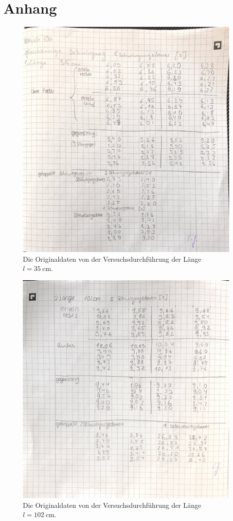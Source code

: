 \section{Anhang}
\label{sec:anhang}


\begin{figure}
    \centering
    \includegraphics[width=\textwidth]{bilder/daten1.pdf}
    \caption{Die Originaldaten von der Versuchsdurchführung der Länge $l = \SI{35}{\centi\metre}$.}
    \label{fig:originaldaten1}
\end{figure}
\begin{figure}
    \centering
    \includegraphics[width=\textwidth]{bilder/daten2.pdf}
    \caption{Die Originaldaten von der Versuchsdurchführung der Länge $l = \SI{102}{\centi\metre}$.}
    \label{fig:originaldaten2}
\end{figure}